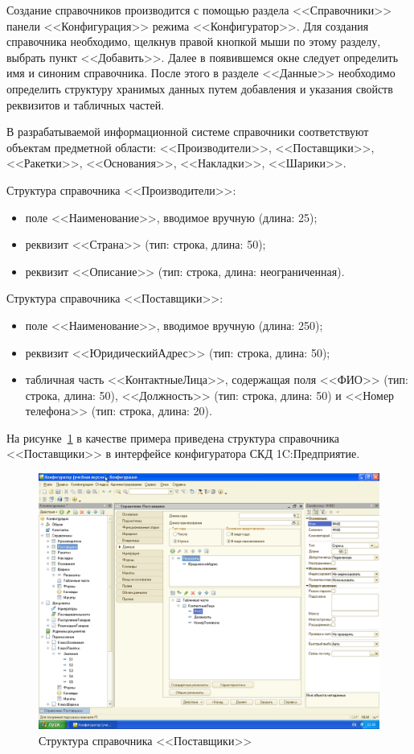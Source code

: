 Создание справочников производится с помощью раздела <<Справочники>>
панели <<Конфигурация>> режима <<Конфигуратор>>.
Для создания справочника необходимо, щелкнув правой кнопкой мыши по этому
разделу, выбрать пункт <<Добавить>>. Далее в появившемся окне
следует определить имя и синоним справочника.
После этого в разделе <<Данные>> необходимо определить структуру
хранимых данных путем добавления и указания свойств реквизитов
и табличных частей.

В разрабатываемой информационной системе справочники соответствуют
объектам предметной области: <<Производители>>, <<Поставщики>>,
<<Ракетки>>, <<Основания>>, <<Накладки>>, <<Шарики>>.

Структура справочника <<Производители>>:
\begin{itemize}
\item поле <<Наименование>>, вводимое вручную (длина: 25);
\item реквизит <<Страна>> (тип: строка, длина: 50);
\item реквизит <<Описание>> (тип: строка, длина: неограниченная).
\end{itemize}

Структура справочника <<Поставщики>>:
\begin{itemize}
\item поле <<Наименование>>, вводимое вручную (длина: 250);
\item реквизит <<ЮридическийАдрес>> (тип: строка, длина: 50);
\item табличная часть <<КонтактныеЛица>>, содержащая поля
  <<ФИО>> (тип: строка, длина: 50),
  <<Должность>> (тип: строка, длина: 50) и
  <<Номер телефона>> (тип: строка, длина: 20).
\end{itemize}

На рисунке~\ref{fig:sprav_postav} в качестве примера приведена
структура справочника <<Поставщики>> в интерфейсе конфигуратора
СКД 1C:Предприятие.

\begin{figure}[h!]
  \centering
  \includegraphics[width=130mm]{pic/sprav_postav}
  \caption{Структура справочника <<Поставщики>>}
  \label{fig:sprav_postav}
\end{figure}

